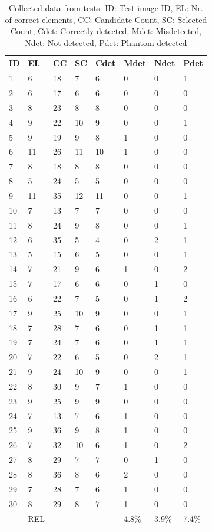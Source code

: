 \documentclass[10pt,twocolumn,letterpaper]{article}
\begin{document}
\begin{table}[H]
\centering
\begin{tabular}{l|l|l|l|l|l|l|l} \hline
		ID & EL & CC & SC & Cdet & Mdet & Ndet & Pdet \\ \hline \hline
		1&6&18&7&6&0&0&1\\ \hline
		2&6&17&6&6&0&0&0\\ \hline
		3&8&23&8&8&0&0&0\\ \hline
		4&9&22&10&9&0&0&1\\ \hline
		5&9&19&9&8&1&0&0\\ \hline
		6&11&26&11&10&1&0&0\\ \hline
		7&8&18&8&8&0&0&0\\ \hline
		8&5&24&5&5&0&0&0\\ \hline
		9&11&35&12&11&0&0&1\\ \hline
		10&7&13&7&7&0&0&0\\ \hline
		11&8&24&9&8&0&0&1\\ \hline
		12&6&35&5&4&0&2&1\\ \hline
		13&5&15&6&5&0&0&1\\ \hline
		14&7&21&9&6&1&0&2\\ \hline
		15&7&17&6&6&0&1&0\\ \hline
		16&6&22&7&5&0&1&2\\ \hline
		17&9&25&10&9&0&0&1\\ \hline
		18&7&28&7&6&0&1&1\\ \hline
		19&7&24&7&6&0&1&1\\ \hline
		20&7&22&6&5&0&2&1\\ \hline
		21&9&24&10&9&0&0&1\\ \hline
		22&8&30&9&7&1&0&0\\ \hline
		23&9&25&9&9&0&0&0\\ \hline
		24&7&13&7&6&1&0&0\\ \hline
		25&9&36&9&8&1&0&0\\ \hline
		26&7&32&10&6&1&0&2\\ \hline
		27&8&29&7&7&0&1&0\\ \hline
		28&8&36&8&6&2&0&0\\ \hline
		29&7&28&7&6&1&0&0\\ \hline
		30&8&29&8&7&1&0&0\\ \hline \hline
			& REL & & & & 4.8\% & 3.9\% & 7.4\% \\ \hline
\end{tabular}
\caption{Collected data from tests. ID: Test image ID, EL: Nr. of correct elements, CC: Candidate Count, SC: Selected Count, Cdet: Correctly detected, Mdet: Misdetected, Ndet: Not detected, Pdet: Phantom detected}
\label{tab:det1}
\end{table}
\par
\end{document}
